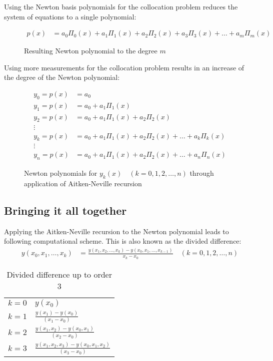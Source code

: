 Using the Newton basis polynomials for the collocation problem reduces the
system of equations to a single polynomial:
\begin{figure}[H]
	\centering
	\renewcommand{\figurename}{Equations}
	\begin{align}
		p(x) &= a_0 \Pi_0(x) + a_1 \Pi_1(x) + a_2 \Pi_2(x) + a_3 \Pi_3(x)
			+ \dots + a_m \Pi_m(x)
	\end{align}
	\caption{Resulting Newton polynomial to the degree $m$}
\end{figure}

Using more measurements for the collocation problem results in an increase of
the degree of the Newton polynomial:
\begin{figure}[H]
	\centering
	\renewcommand{\figurename}{Equations}
	\begin{align*}
		y_0 = p(x) &= a_0 \\
		y_1 = p(x) &= a_0 + a_1 \Pi_1(x) \\
		y_2 = p(x) &= a_0 + a_1 \Pi_1(x) + a_2 \Pi_2(x) \\
		\vdots \\
		y_k = p(x) &= a_0 + a_1 \Pi_1(x) + a_2 \Pi_2(x) + \dots + a_k \Pi_k(x) \\
		\vdots \\
		y_n = p(x) &= a_0 + a_1 \Pi_1(x) + a_2 \Pi_2(x) + \dots + a_n \Pi_n(x)
	\end{align*}
	\caption{Newton polynomials for $y_k(x) \quad (k = 0,1,2,\dots,n)$
		through application of Aitken-Neville recursion}
\end{figure}


\subsection{Bringing it all together}
Applying the Aitken-Neville recursion to the Newton polynomial leads to
following computational scheme. This is also known as the divided difference:
\begin{align}
	y(x_0, x_1, \dots, x_k) &= \frac{y(x_1, x_2, \dots, x_k) - y(x_0, x_1, \dots, x_{k-1})}
		{x_k - x_0} \quad (k = 0,1,2,\dots,n)
\end{align}

\begin{table}[H]
	\centering
	\begin{tabular}{ r | l }
	$k = 0$ & $y(x_0)$\\
	$k = 1$ & $\frac{y(x_1) - y(x_0)}{(x_1 - x_0)}$\\
	$k = 2$ & $\frac{y(x_1, x_2) - y(x_0, x_1)}{(x_2 - x_0)}$\\
	$k = 3$ & $\frac{y(x_1, x_2, x_3) - y(x_0, x_1, x_2)}{(x_3 - x_0)}$\\
	\end{tabular}
	\caption{Divided difference up to order 3}
\end{table}

